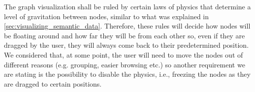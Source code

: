 The graph visualization shall be ruled by certain laws of physics that determine a level of gravitation between nodes, similar to what was explained in \autoref{sec:visualizing_semantic_data}. Therefore, these rules will decide how nodes will be floating around and how far they will be from each other so, even if they are dragged by the user, they will always come back to their predetermined position. We considered that, at some point, the user will need to move the nodes out of different reasons (e.g. grouping, easier browsing etc.) so another requirement we are stating is the possibility to disable the physics, i.e., freezing the nodes as they are dragged to certain positions.




























